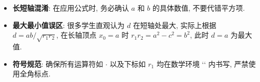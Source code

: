 \begin{trapbox}
\begin{itemize}
    \item \textbf{长短轴混淆}: 在应用公式时, 务必确认 $a$ 和 $b$ 的具体数值, 不要代错平方项.
    \item \textbf{最大最小值误区}: 很多学生直观认为 $d$ 在短轴处最大, 实际上根据 $d = ab/\sqrt{r_1r_2}$, 在长轴顶点 $x_0 = a$ 时 $r_1r_2 = a^2 - c^2 = b^2$, 此时 $d = a$ 为最大值.
    \item \textbf{符号规范}: 确保所有运算符如 $\cdot$ 以及下标如 $r_1$ 均在数学环境 `$ $` 内书写, 严禁使用全角标点.
\end{itemize}
\end{trapbox}